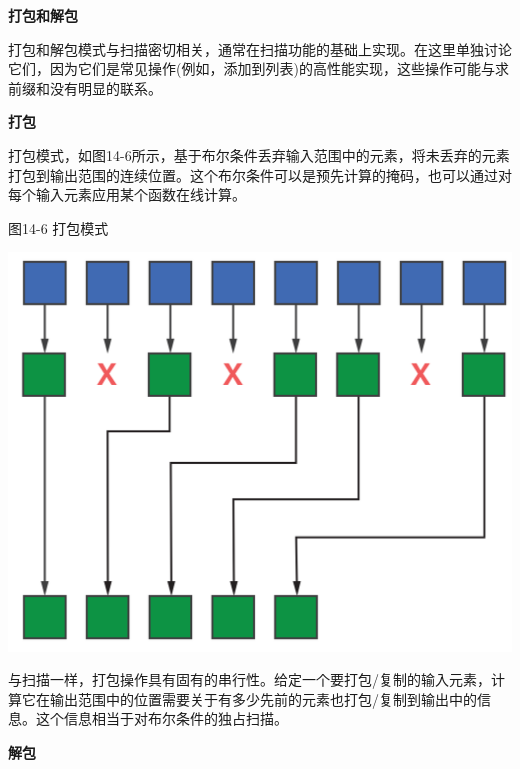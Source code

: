\hspace*{\fill} \par %
\textbf{打包和解包}

打包和解包模式与扫描密切相关，通常在扫描功能的基础上实现。在这里单独讨论它们，因为它们是常见操作(例如，添加到列表)的高性能实现，这些操作可能与求前缀和没有明显的联系。\par

\hspace*{\fill} \par %
\textbf{打包}

打包模式，如图14-6所示，基于布尔条件丢弃输入范围中的元素，将未丢弃的元素打包到输出范围的连续位置。这个布尔条件可以是预先计算的掩码，也可以通过对每个输入元素应用某个函数在线计算。\par

\hspace*{\fill} \par %
图14-6 打包模式
\begin{center}
	\includegraphics[width=1.\textwidth]{content/chapter-14/images/6}
\end{center}

与扫描一样，打包操作具有固有的串行性。给定一个要打包/复制的输入元素，计算它在输出范围中的位置需要关于有多少先前的元素也打包/复制到输出中的信息。这个信息相当于对布尔条件的独占扫描。\par

\hspace*{\fill} \par %
\textbf{解包}


